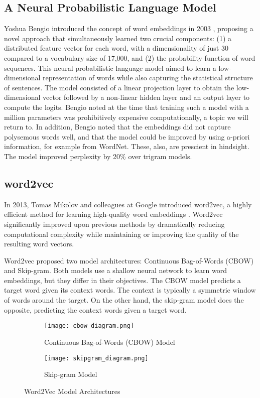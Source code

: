 \documentclass[a4paper, oneside]{discothesis}
\begin{document}
\subsection{A Neural Probabilistic Language Model}
Yoshua Bengio introduced the concept of word embeddings in 2003 \cite{bengio2003neural}, proposing a novel approach that simultaneously learned two crucial components: (1) a distributed feature vector for each word, with a dimensionality of just 30 compared to a vocabulary size of 17,000, and (2) the probability function of word sequences. 
This neural probabilistic language model aimed to learn a low-dimensional representation of words while also capturing the statistical structure of sentences. 
The model consisted of a linear projection layer to obtain the low-dimensional vector followed by a non-linear hidden layer and an output layer to compute the logits.
Bengio noted at the time that training such a model with a million parameters was prohibitively expensive computationally, a topic we will return to. 
In addition, Bengio noted that the embeddings did not capture polysemous words well, and that the model could be improved by using a-priori information, for example from WordNet.
These, also, are prescient in hindsight. The model improved perplexity by 20\% over trigram models. 

\subsection{word2vec}
In 2013, Tomas Mikolov and colleagues at Google introduced word2vec, a highly efficient method for learning high-quality word embeddings \cite{mikolov2013efficient}. Word2vec significantly improved upon previous methods by dramatically reducing computational complexity while maintaining or improving the quality of the resulting word vectors.

Word2vec proposed two model architectures: Continuous Bag-of-Words (CBOW) and Skip-gram. Both models use a shallow neural network to learn word embeddings, but they differ in their objectives. 
The CBOW model predicts a target word given its context words. The context is typically a symmetric window of words around the target.
On the other hand, the skip-gram model does the opposite, predicting the context words given a target word.
\begin{figure}[h]
    \centering
    \begin{subfigure}[b]{0.45\textwidth}
        \centering
        \texttt{[image: cbow\_diagram.png]}
        \caption{Continuous Bag-of-Words (CBOW) Model}
        \label{fig:cbow}
    \end{subfigure}
    \hfill
    \begin{subfigure}[b]{0.45\textwidth}
        \centering
        \texttt{[image: skipgram\_diagram.png]}
        \caption{Skip-gram Model}
        \label{fig:skipgram}
    \end{subfigure}
    \caption{Word2Vec Model Architectures}
    \label{fig:word2vec}
\end{figure}
\end{document}
